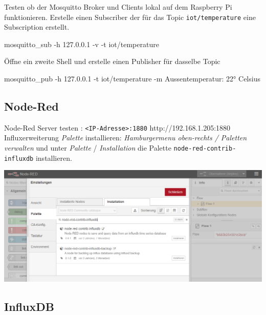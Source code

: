 \documentclass[
  11pt,
  a4paper,
  oneside, openany  ,captions=tableheading
]{scrbook}
\newenvironment{Shaded}{\begin{snugshade}}{\end{snugshade}}
\newcommand{\AttributeTok}[1]{\textcolor[rgb]{0.40,0.45,0.13}{#1}}
\newcommand{\ExtensionTok}[1]{\textcolor[rgb]{0.00,0.23,0.31}{#1}}
\newcommand{\NormalTok}[1]{\textcolor[rgb]{0.00,0.23,0.31}{#1}}
\newcommand{\StringTok}[1]{\textcolor[rgb]{0.13,0.47,0.30}{#1}}
\theoremstyle{remark}
\begin{document}
Testen ob der Mosquitto Broker und Clients lokal auf dem Raspberry Pi
funktionieren. Erstelle einen Subscriber der für das Topic
\texttt{iot/temperature} eine Subscription erstellt.

\begin{Shaded}
\begin{Highlighting}[]
\ExtensionTok{mosquitto\_sub} \AttributeTok{{-}h}\NormalTok{ 127.0.0.1 }\AttributeTok{{-}v} \AttributeTok{{-}t} \StringTok{\textquotesingle{}iot/temperature\textquotesingle{}}
\end{Highlighting}
\end{Shaded}

Öffne ein zweite Shell und erstelle einen Publisher für dasselbe Topic

\begin{Shaded}
\begin{Highlighting}[]
\ExtensionTok{mosquitto\_pub} \AttributeTok{{-}h}\NormalTok{ 127.0.0.1 }\AttributeTok{{-}t} \StringTok{\textquotesingle{}iot/temperature\textquotesingle{}} \AttributeTok{{-}m} \StringTok{\textquotesingle{}Aussentemperatur: 22° Celsius\textquotesingle{}}
\end{Highlighting}
\end{Shaded}

\subsection{Node-Red}\label{node-red}

Node-Red Server testen :
\texttt{\textless{}IP-Adresse\textgreater{}:1880}
http://192.168.1.205:1880 Influxerweiterung \emph{Palette} installieren:
\emph{Hamburgermenu oben-rechts / Paletten verwalten} und unter
\emph{Palette} / \emph{Installation} die Palette
\texttt{node-red-contrib-influxdb} installieren.

\includegraphics{images/5200_iot_nodered_influxdb_erweiterung.png}

\subsection{InfluxDB}\label{influxdb}
\end{document}
